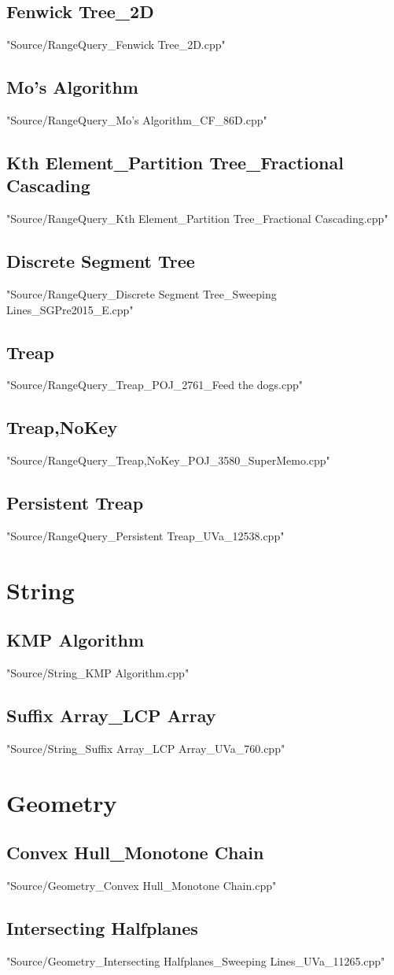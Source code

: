 \documentclass [12pt,twocolumn,oneside]{article}
\begin{document}
\subsection{Fenwick Tree\_2D}
 {"Source/RangeQuery_Fenwick Tree_2D.cpp"}
\subsection{Mo's Algorithm}
 {"Source/RangeQuery_Mo's Algorithm_CF_86D.cpp"}
\subsection{Kth Element\_Partition Tree\_Fractional Cascading}
 {"Source/RangeQuery_Kth Element_Partition Tree_Fractional Cascading.cpp"}
\subsection{Discrete Segment Tree}
 {"Source/RangeQuery_Discrete Segment Tree_Sweeping Lines_SGPre2015_E.cpp"}
\subsection{Treap}
 {"Source/RangeQuery_Treap_POJ_2761_Feed the dogs.cpp"}
\subsection{Treap,NoKey}
 {"Source/RangeQuery_Treap,NoKey_POJ_3580_SuperMemo.cpp"}
\subsection{Persistent Treap}
 {"Source/RangeQuery_Persistent Treap_UVa_12538.cpp"}

\newpage
\section{String}
\subsection{KMP Algorithm}
 {"Source/String_KMP Algorithm.cpp"}
\subsection{Suffix Array\_LCP Array}
 {"Source/String_Suffix Array_LCP Array_UVa_760.cpp"}

\newpage
\section{Geometry}
\subsection{Convex Hull\_Monotone Chain}
 {"Source/Geometry_Convex Hull_Monotone Chain.cpp"}
\subsection{Intersecting Halfplanes}
 {"Source/Geometry_Intersecting Halfplanes_Sweeping Lines_UVa_11265.cpp"}
\end{document}
